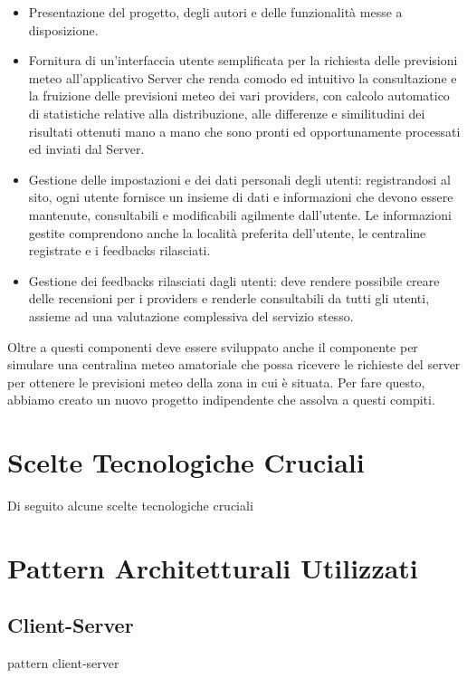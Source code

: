     \begin{itemize}
    
        \item Presentazione del progetto, degli autori e delle funzionalità messe a disposizione.
        
        \item Fornitura di un'interfaccia utente semplificata per la richiesta delle previsioni meteo all'applicativo Server che renda comodo ed intuitivo la consultazione e la fruizione delle previsioni meteo dei vari providers, con calcolo automatico di statistiche relative alla distribuzione, alle differenze e similitudini dei risultati ottenuti mano a mano che sono pronti ed opportunamente processati ed inviati dal Server.
        
        \item Gestione delle impostazioni e dei dati personali degli utenti: registrandosi al sito, ogni utente fornisce un insieme di dati e informazioni che devono essere mantenute, consultabili e modificabili agilmente dall'utente. Le informazioni gestite comprendono anche la località preferita dell'utente, le centraline registrate e i feedbacks rilasciati.
        
        \item Gestione dei feedbacks rilasciati dagli utenti: deve rendere possibile creare delle recensioni per i providers e renderle consultabili da tutti gli utenti, assieme ad una valutazione complessiva del servizio stesso.
    
    \end{itemize}
    
    \par Oltre a questi componenti deve essere sviluppato anche il componente per simulare una centralina meteo amatoriale che possa ricevere le richieste del server per ottenere le previsioni meteo della zona in cui è situata. Per fare questo, abbiamo creato un nuovo progetto indipendente che assolva a questi compiti.
    
    \section{Scelte Tecnologiche Cruciali}
    Di seguito alcune scelte tecnologiche cruciali

    \section{Pattern Architetturali Utilizzati}
        \subsection{Client-Server}
        pattern client-server 
    